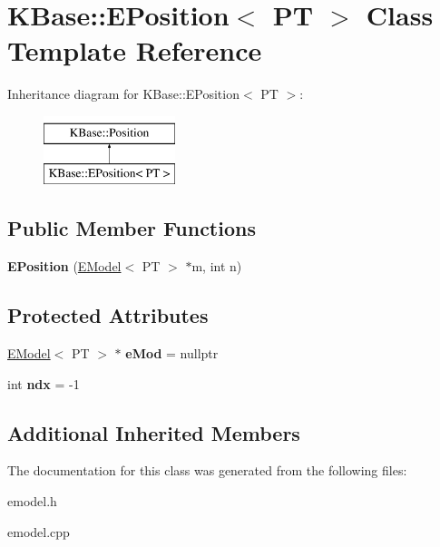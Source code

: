 \hypertarget{class_k_base_1_1_e_position}{\section{K\-Base\-:\-:E\-Position$<$ P\-T $>$ Class Template Reference}
\label{class_k_base_1_1_e_position}
}
Inheritance diagram for K\-Base\-:\-:E\-Position$<$ P\-T $>$\-:\begin{figure}[H]
\begin{center}
\leavevmode
\includegraphics[height=2.000000cm]{class_k_base_1_1_e_position}
\end{center}
\end{figure}
\subsection*{Public Member Functions}
\begin{DoxyCompactItemize}
\item 
\hypertarget{class_k_base_1_1_e_position_a0710d98dde1e1582239699621a6b97aa}{{\bfseries E\-Position} (\hyperlink{class_k_base_1_1_e_model}{E\-Model}$<$ P\-T $>$ $\ast$m, int n)}\label{class_k_base_1_1_e_position_a0710d98dde1e1582239699621a6b97aa}

\end{DoxyCompactItemize}
\subsection*{Protected Attributes}
\begin{DoxyCompactItemize}
\item 
\hypertarget{class_k_base_1_1_e_position_adcf829a42e8b732d69dea75a0e4476c8}{\hyperlink{class_k_base_1_1_e_model}{E\-Model}$<$ P\-T $>$ $\ast$ {\bfseries e\-Mod} = nullptr}\label{class_k_base_1_1_e_position_adcf829a42e8b732d69dea75a0e4476c8}

\item 
\hypertarget{class_k_base_1_1_e_position_a3e8046ec0148d120946072fee775e895}{int {\bfseries ndx} = -\/1}\label{class_k_base_1_1_e_position_a3e8046ec0148d120946072fee775e895}

\end{DoxyCompactItemize}
\subsection*{Additional Inherited Members}


The documentation for this class was generated from the following files\-:\begin{DoxyCompactItemize}
\item 
emodel.\-h\item 
emodel.\-cpp\end{DoxyCompactItemize}
